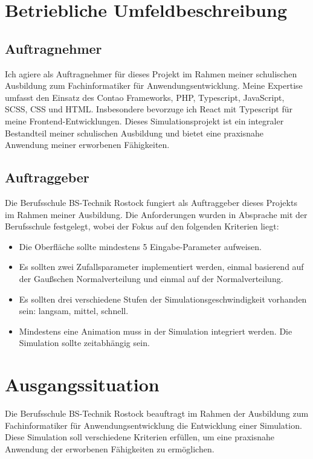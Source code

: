 \documentclass[hidelinks,12pt]{article}
\begin{document}
\section{Betriebliche Umfeldbeschreibung}

\subsection{Auftragnehmer}
Ich agiere als Auftragnehmer für dieses Projekt im Rahmen meiner schulischen Ausbildung zum Fachinformatiker für Anwendungsentwicklung. Meine Expertise umfasst den Einsatz des Contao Frameworks, PHP, Typescript, JavaScript, SCSS, CSS und HTML. Insbesondere bevorzuge ich React mit Typescript für meine Frontend-Entwicklungen. Dieses Simulationsprojekt ist ein integraler Bestandteil meiner schulischen Ausbildung und bietet eine praxisnahe Anwendung meiner erworbenen Fähigkeiten.

\subsection{Auftraggeber}
Die Berufsschule BS-Technik Rostock fungiert als Auftraggeber dieses Projekts im Rahmen meiner Ausbildung. Die Anforderungen wurden in Absprache mit der Berufsschule festgelegt, wobei der Fokus auf den folgenden Kriterien liegt:

\begin{itemize}
    \item Die Oberfläche sollte mindestens 5 Eingabe-Parameter aufweisen.
    \item Es sollten zwei Zufallsparameter implementiert werden, einmal basierend auf der Gaußschen Normalverteilung und einmal auf der Normalverteilung.
    \item Es sollten drei verschiedene Stufen der Simulationsgeschwindigkeit vorhanden sein: langsam, mittel, schnell.
    \item Mindestens eine Animation muss in der Simulation integriert werden. Die Simulation sollte zeitabhängig sein.
\end{itemize}

\section{Ausgangssituation}
Die Berufsschule BS-Technik Rostock beauftragt im Rahmen der Ausbildung zum Fachinformatiker für Anwendungsentwicklung die Entwicklung einer Simulation. Diese Simulation soll verschiedene Kriterien erfüllen, um eine praxisnahe Anwendung der erworbenen Fähigkeiten zu ermöglichen.
\end{document}
